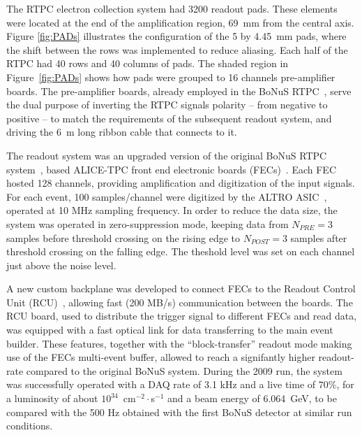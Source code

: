 \documentclass[preprint,5p]{elsarticle}
\begin{document}
The RTPC electron collection system had 3200 readout pads. These elements were
located at the end of the amplification region, 69~mm from the central axis.
Figure \ref{fig:PADs} illustrates the configuration of the 5 by 4.45~mm pads,
where the shift between the rows was implemented to reduce aliasing. Each half 
of the RTPC had 40 rows and 40 columns of pads. The shaded region in 
Figure~\ref{fig:PADs} shows how pads were grouped to 16 channels pre-amplifier 
boards. The pre-amplifier boards, already employed in the BoNuS 
RTPC~\cite{Fenker:2008zz}, serve the dual purpose of inverting the RTPC signals 
polarity -- from negative to positive -- to match the requirements of the 
subsequent readout system, and driving the 6~m long ribbon cable that connects 
to it.


The readout system was an upgraded version of the original BoNuS RTPC system~\cite{Fenker:2008zz}, 
based ALICE-TPC front end electronic boards (FECs)~\cite{ALICE-FEE}. 
Each FEC hosted 128 channels, providing amplification and digitization of the input signals.  For each event, 100 samples/channel were digitized by the ALTRO ASIC~\cite{EsteveBosch:2003bj}, operated at 10 MHz sampling frequency. In order to reduce the data size, the system was operated in zero-suppression mode, keeping data from $N_{PRE}=3$ samples before threshold crossing on the rising edge to $N_{POST}=3$ samples after threshold crossing on the falling edge. The theshold level was set on each channel just above the noise level.

A new custom backplane was developed to connect FECs to the Readout Control Unit (RCU)~\cite{RCU}, allowing fast (200 MB/s) communication between the boards. The RCU board, used to distribute the trigger signal to different FECs and read data, was equipped with a fast optical link for data transferring to the main event builder. These features, together with the ``block-transfer'' readout mode making use of the FECs multi-event buffer, allowed to reach a signifantly higher readout-rate compared to the original BoNuS system.  During the 2009 run, the system was successfully 
operated with a DAQ rate of 3.1 kHz and a live time of $70 \%$, for a 
luminosity of about $10^{34}$~cm$^{-2}\cdot$s$^{-1}$ and a beam energy of 
6.064~GeV, to be compared with the 500 Hz obtained with the first BoNuS detector at similar run conditions.
\end{document}
